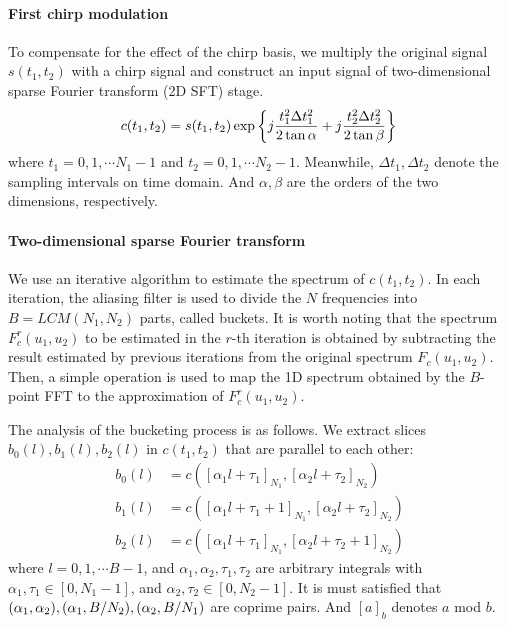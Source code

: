 \documentclass[conference]{IEEEtran}
\begin{document}
\paragraph{First chirp modulation} To compensate for the effect of the chirp basis, we multiply the original signal $s({t_1}, {t_2})$ with a chirp signal and construct an input signal of two-dimensional sparse Fourier transform (2D SFT) stage.
\begin{align}
	{c}({t_1},{t_2}) = s({t_1},{t_2})\exp \left\{ {j\frac{{t_1^2\Delta t_1^2}}{{2\tan \alpha }} + j\frac{{t_2^2\Delta t_2^2}}{{2\tan \beta }}} \right\}{\rm{ }}
\end{align}
where ${t_1} = 0,1, \cdots {N_1} - 1$ and ${t_2} = 0,1, \cdots {N_2} - 1$. Meanwhile, $\Delta {t_1},\Delta {t_2}$ denote the sampling intervals on time domain. And $\alpha ,\beta$ are the orders of the two dimensions, respectively.

\paragraph{Two-dimensional sparse Fourier transform} We use an iterative algorithm to estimate the spectrum of ${c}({t_1},{t_2})$. In each iteration, the aliasing filter is used to divide the $N$ frequencies into $B = LCM({N_1},{N_2})$ parts, called buckets. It is worth noting that the spectrum $F_c^r({u_1},{u_2})$ to be estimated in the $r$-th iteration is obtained by subtracting the result estimated by previous iterations from the original spectrum ${F_c}({u_1},{u_2})$. Then, a simple operation is used to map the 1D spectrum obtained by the $B$-point FFT to the approximation of ${F_c^r}({u_1},{u_2})$.

The analysis of the bucketing process is as follows. We extract slices ${b_0}(l),{b_1}(l),{b_2}(l)$ in ${c}({t_1},{t_2})$ that are parallel to each other:
\begin{align}
	{b_0}(l) &= c({[{\alpha _1}l + {\tau _1}]_{{N_1}}},{[{\alpha _2}l + {\tau _2}]_{{N_2}}})\\
	{b_1}(l) &= c({[{\alpha _1}l + {\tau _1} + 1]_{{N_1}}},{[{\alpha _2}l + {\tau _2}]_{{N_2}}})\\
	{b_2}(l) &= c({[{\alpha _1}l + {\tau _1}]_{{N_1}}},{[{\alpha _2}l + {\tau _2} + 1]_{{N_2}}})
\end{align}
where $l = 0,1, \cdots B - 1$, and ${\alpha _1}, {\alpha _2},{\tau _1},{\tau _2}$ are arbitrary integrals with ${\alpha _1},{\tau _1} \in [0,{N_1} - 1]$, and $ {\alpha _2},{\tau _2} \in [0,{N_2} - 1] $. It is must satisfied that $({\alpha _1},{\alpha _2}),({\alpha _1},{B \mathord{\left/
		{\vphantom {B {{N_2}}}} \right.
		\kern-\nulldelimiterspace} {{N_2}}}),({\alpha _2},{B \mathord{\left/
		{\vphantom {B {{N_1}}}} \right.
		\kern-\nulldelimiterspace} {{N_1}}})$ are coprime pairs. And ${[a]_b}$ denotes $a$ mod $b$.
\end{document}
